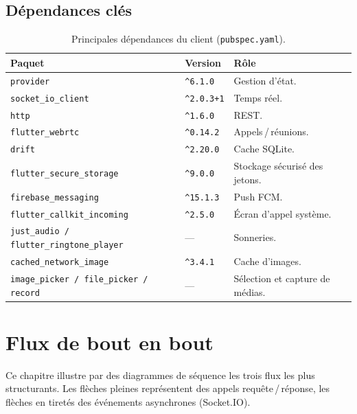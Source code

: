 \documentclass[11pt,a4paper,oneside]{report}
\newcommand{\thd}[1]{\textbf{\textcolor{AlanyaIndigoDark}{#1}}}
\begin{document}
\section{D\'{e}pendances cl\'{e}s}
\begin{table}[H]
\centering\small
\begin{tabularx}{\linewidth}{@{}l l X@{}}
\toprule
\thd{Paquet} & \thd{Version} & \thd{R\^{o}le}\\
\midrule
\texttt{provider}                & \texttt{\^{}6.1.0}   & Gestion d'\'{e}tat.\\
\texttt{socket\_io\_client}      & \texttt{\^{}2.0.3+1} & Temps r\'{e}el.\\
\texttt{http}                    & \texttt{\^{}1.6.0}   & REST.\\
\texttt{flutter\_webrtc}         & \texttt{\^{}0.14.2}  & Appels\,/\,r\'{e}unions.\\
\texttt{drift}                   & \texttt{\^{}2.20.0}  & Cache SQLite.\\
\texttt{flutter\_secure\_storage}& \texttt{\^{}9.0.0}   & Stockage s\'{e}curis\'{e} des jetons.\\
\texttt{firebase\_messaging}     & \texttt{\^{}15.1.3}  & Push FCM.\\
\texttt{flutter\_callkit\_incoming} & \texttt{\^{}2.5.0} & \'{E}cran d'appel syst\`{e}me.\\
\texttt{just\_audio\,/\,flutter\_ringtone\_player} & --- & Sonneries.\\
\texttt{cached\_network\_image}  & \texttt{\^{}3.4.1}   & Cache d'images.\\
\texttt{image\_picker\,/\,file\_picker\,/\,record} & --- & S\'{e}lection et capture de m\'{e}dias.\\
\bottomrule
\end{tabularx}
\caption{Principales d\'{e}pendances du client (\texttt{pubspec.yaml}).}
\end{table}

\chapter{Flux de bout en bout}
\label{chap:flux}

Ce chapitre illustre par des diagrammes de s\'{e}quence les trois flux les plus
structurants. Les fl\`{e}ches pleines repr\'{e}sentent des appels requ\^{e}te\,/\,r\'{e}ponse,
les fl\`{e}ches en tiret\'{e}s des \'{e}v\'{e}nements asynchrones (Socket.IO).
\end{document}

